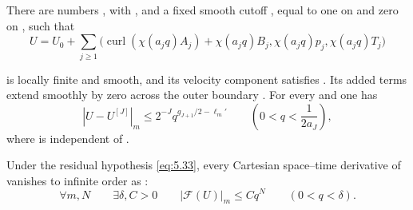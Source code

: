 \begin{lemma}\label{lem:5.4}
There are numbers , with
, and a fixed smooth cutoff , equal to one
on  and zero on \NSi{NS-F-P057-053}{[1,\infty)}, such that
\begin{equation}
 U=U_0+\sum_{j\geq1}
 \bigl(\operatorname{curl}(\chi(a_jq)A_j)+\chi(a_jq)B_j,
       \chi(a_jq)p_j,\chi(a_jq)T_j\bigr)
 \tag{5.34}\label{eq:5.34}
\end{equation}

%
is locally finite and smooth, and its velocity component  satisfies
. Its added terms extend smoothly by zero across the outer
boundary . For every  and
 one has
\begin{equation}
 |U-U^{[J]}|_m\leq2^{-J}q^{g_{J+1}/2-\ell_m'}
 \qquad\left(0<q<\frac1{2a_J}\right),
 \tag{5.35}\label{eq:5.35}
\end{equation}
where  is independent of .

Under the residual hypothesis \eqref{eq:5.33}, every Cartesian space--time derivative of
 vanishes to infinite order as
:
\begin{equation}
 \forall m,N\qquad\exists\delta,C>0\qquad
 |\mathcal F(U)|_m\leq Cq^N
 \qquad(0<q<\delta).
 \tag{5.36}\label{eq:5.36}
\end{equation}
\end{lemma}

